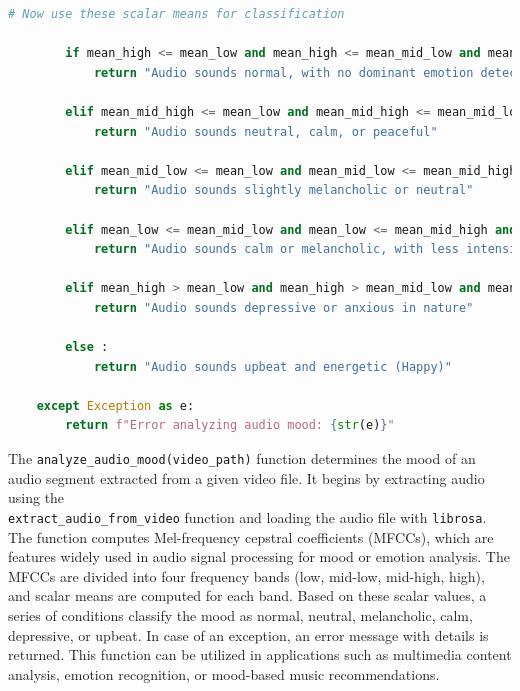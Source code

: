 \begin{tcolorbox}[colback=gray!5!white, colframe=gray!80!black, boxrule=0.5pt, title=Analyze Audio Mood Based on Extracted Audio]
    \begin{lstlisting}[language=Python]
        # Now use these scalar means for classification

        if mean_high <= mean_low and mean_high <= mean_mid_low and mean_high <= mean_mid_high:
            return "Audio sounds normal, with no dominant emotion detected"

        elif mean_mid_high <= mean_low and mean_mid_high <= mean_mid_low and mean_mid_high <= mean_high:
            return "Audio sounds neutral, calm, or peaceful"

        elif mean_mid_low <= mean_low and mean_mid_low <= mean_mid_high and mean_mid_low <= mean_high:
            return "Audio sounds slightly melancholic or neutral"

        elif mean_low <= mean_mid_low and mean_low <= mean_mid_high and mean_low <= mean_high:
            return "Audio sounds calm or melancholic, with less intensity"

        elif mean_high > mean_low and mean_high > mean_mid_low and mean_high <= mean_mid_high:
            return "Audio sounds depressive or anxious in nature"

        else :
            return "Audio sounds upbeat and energetic (Happy)"

    except Exception as e:
        return f"Error analyzing audio mood: {str(e)}"
    \end{lstlisting}
\end{tcolorbox}

\noindent
The \texttt{analyze\_audio\_mood(video\_path)} function determines the mood of an audio segment extracted from a given video file. It begins by extracting audio using the \\ \texttt{extract\_audio\_from\_video} function and loading the audio file with \texttt{librosa}. The function computes Mel-frequency cepstral coefficients (MFCCs), which are features widely used in audio signal processing for mood or emotion analysis. The MFCCs are divided into four frequency bands (low, mid-low, mid-high, high), and scalar means are computed for each band. Based on these scalar values, a series of conditions classify the mood as normal, neutral, melancholic, calm, depressive, or upbeat. In case of an exception, an error message with details is returned. This function can be utilized in applications such as multimedia content analysis, emotion recognition, or mood-based music recommendations.


